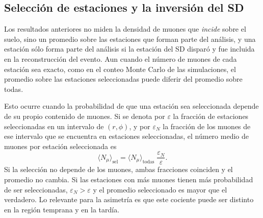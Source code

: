 
\subsection{Selección de estaciones y la inversión del SD}
\label{subsec:seleccion_estaciones}

{\leavevmode\color{blue}Los resultados anteriores no miden la densidad de muones que \textit{incide} sobre el suelo, sino un promedio sobre las estaciones que forman parte del análisis, y una estación sólo forma parte del análisis si la estación del SD disparó y fue incluida en la reconstrucción del evento. Aun cuando el número de muones de cada estación sea exacto, como en el conteo Monte Carlo de las simulaciones, el promedio sobre las estaciones seleccionadas puede diferir del promedio sobre todas.}

{\leavevmode\color{blue}Esto ocurre cuando la probabilidad de que una estación sea seleccionada depende de su propio contenido de muones. Si se denota por $\varepsilon$ la fracción de estaciones seleccionadas en un intervalo de $(r,\phi)$, y por $\varepsilon_N$ la fracción de los muones de ese intervalo que se encuentra en estaciones seleccionadas, el número medio de muones por estación seleccionada es
\begin{equation}
	\langle N_\mu \rangle_{\text{sel}} = \langle N_\mu \rangle_{\text{todas}}\;\frac{\varepsilon_N}{\varepsilon}.
	\label{eq:seleccion}
\end{equation}
Si la selección no depende de los muones, ambas fracciones coinciden y el promedio no cambia. Si las estaciones con más muones tienen más probabilidad de ser seleccionadas, $\varepsilon_N > \varepsilon$ y el promedio seleccionado es mayor que el verdadero. Lo relevante para la asimetría es que este cociente puede ser distinto en la región temprana y en la tardía.}

